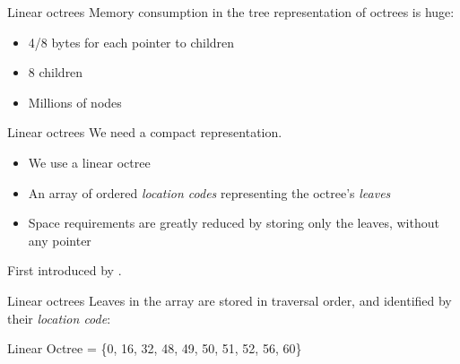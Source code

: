 \documentclass[utf8x]{beamer}
\begin{document}
\begin{frame}{Linear octrees}
Memory consumption in the tree representation of octrees is huge:
\begin{itemize}
\item 4/8 bytes for each pointer to children
\item 8 children
\item Millions of nodes
\end{itemize}
\end{frame}

\begin{frame}{Linear octrees}
We need a compact representation.
\begin{itemize}
\item We use a linear octree
\item An array of ordered \emph{location codes} representing the octree's 
      \emph{leaves}
\item Space requirements are greatly reduced by storing only the leaves, 
      without any pointer
\end{itemize}
First introduced by \cite{Gargantini82}.
\end{frame}

\begin{frame}{Linear octrees}
Leaves in the array are stored in traversal order, and identified by their
\emph{location code}:
\begin{center}
\end{center}
Linear Octree = \{0, 16, 32, 48, 49, 50, 51, 52, 56, 60\}
\end{frame}
\end{document}
